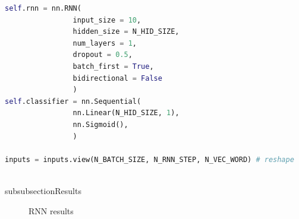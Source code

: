 \documentclass[11pt, a4paper]{article} %
\begin{document}
\begin{lstlisting}[language = python]
self.rnn = nn.RNN(
                input_size = 10,
                hidden_size = N_HID_SIZE,
                num_layers = 1,
                dropout = 0.5,
                batch_first = True,
                bidirectional = False
                )
self.classifier = nn.Sequential(
                nn.Linear(N_HID_SIZE, 1),
                nn.Sigmoid(),
                )

inputs = inputs.view(N_BATCH_SIZE, N_RNN_STEP, N_VEC_WORD) # reshape
\end{lstlisting}
\\subsubsection{Results}
\begin{figure}[H]
    \centering
    \hfill
    \caption{RNN results}
    \label{fig:my_label}
\end{figure}
\end{document}
